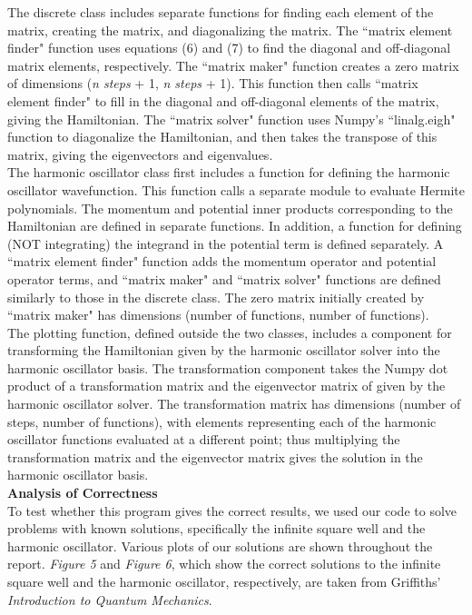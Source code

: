 \documentclass[%
 reprint,
 amsmath,amssymb,
 aps,
]{revtex4-1}
\begin{document}
\noindent The discrete class includes separate functions for finding each element of the matrix, creating the matrix, and diagonalizing the matrix.  The ``matrix element finder" function uses equations (6) and (7) to find the diagonal and off-diagonal matrix elements, respectively.  The ``matrix maker" function creates a zero matrix of dimensions (\textit{n steps} + 1, \textit{n steps} + 1).  This function then calls ``matrix element finder" to fill in the diagonal and off-diagonal elements of the matrix, giving the Hamiltonian.  The ``matrix solver" function uses Numpy's ``linalg.eigh" function to diagonalize the Hamiltonian, and then takes the transpose of this matrix, giving the eigenvectors and eigenvalues.\\

\noindent The harmonic oscillator class first includes a function for defining the harmonic oscillator wavefunction.  This function calls a separate module to evaluate Hermite polynomials.  The momentum and potential inner products corresponding to the Hamiltonian are defined in separate functions.  In addition, a function for defining (NOT integrating) the integrand in the potential term is defined separately.  A ``matrix element finder" function adds the momentum operator and potential operator terms, and ``matrix maker" and ``matrix solver" functions are defined similarly to those in the discrete class.  The zero matrix initially created by ``matrix maker" has dimensions (number of functions, number of functions).\\

\noindent The plotting function, defined outside the two classes, includes a component for transforming the Hamiltonian given by the harmonic oscillator solver into the harmonic oscillator basis.  The transformation component takes the Numpy dot product of a transformation matrix and the eigenvector matrix of given by the harmonic oscillator solver.  The transformation matrix has dimensions (number of steps, number of functions), with elements representing each of the harmonic oscillator functions evaluated at a different point; thus multiplying the transformation matrix and the eigenvector matrix gives the solution in the harmonic oscillator basis.\\

\noindent \textbf{Analysis of Correctness}\\

\noindent To test whether this program gives the correct results, we used our code to solve problems with known solutions, specifically the infinite square well and the harmonic oscillator.  Various plots of our solutions are shown throughout the report.  \textit{Figure 5} and \textit{Figure 6}, which show the correct solutions to the infinite square well and the harmonic oscillator, respectively, are taken from Griffiths' \textit{Introduction to Quantum Mechanics}.\\
\end{document}
